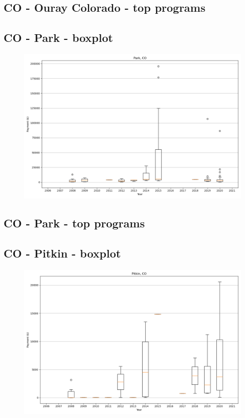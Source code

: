 \subsection*{CO - Ouray Colorado - top programs}

\newpage
\subsection*{CO - Park - boxplot}
\begin{figure}[h]
\centering
\includegraphics[width=7in]{../output/boxplots/counties/Park-CO_boxplot.png}
\end{figure}


\subsection*{CO - Park - top programs}

\newpage
\subsection*{CO - Pitkin - boxplot}
\begin{figure}[h]
\centering
\includegraphics[width=7in]{../output/boxplots/counties/Pitkin-CO_boxplot.png}
\end{figure}


